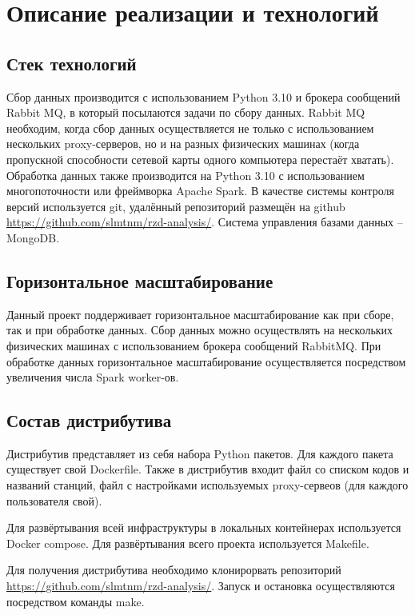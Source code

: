 \documentclass[conference]{IEEEtran}
\begin{document}
\section{Описание реализации и технологий}

\subsection{Стек технологий}
Сбор данных производится с использованием Python 3.10 и брокера сообщений Rabbit MQ, в который посылаются задачи по сбору данных. Rabbit MQ необходим, когда сбор данных осуществляется не только с использованием нескольких proxy-серверов, но и на разных физических машинах (когда пропускной способности сетевой карты одного компьютера перестаёт хватать). Обработка данных также производится на Python 3.10 с использованием многопоточности или фреймворка Apache Spark. В качестве системы контроля версий используется git, удалённый репозиторий размещён на github \href{https://github.com/slmtnm/rzd-analysis/}{https://github.com/slmtnm/rzd-analysis/}. Система управления базами данных -- MongoDB.

\subsection{Горизонтальное масштабирование}

Данный проект поддерживает горизонтальное масштабирование как при сборе, так и при обработке данных. Сбор данных можно осуществлять на нескольких физических машинах с использованием брокера сообщений RabbitMQ. При обработке данных горизонтальное масштабирование осуществляется посредством увеличения числа Spark worker-ов.

\subsection{Состав дистрибутива}

Дистрибутив представляет из себя набора Python пакетов. Для каждого пакета существует свой Dockerfile. Также в дистрибутив входит файл со списком кодов и названий станций, файл с настройками используемых proxy-сервеов (для каждого пользователя свой).

Для развёртывания всей инфраструктуры в локальных контейнерах используется Docker compose. Для развёртывания всего проекта используется Makefile.

Для получения дистрибутива необходимо клонирорвать репозиторий \href{https://github.com/slmtnm/rzd-analysis/}{https://github.com/slmtnm/rzd-analysis/}. Запуск и остановка осуществляются посредством команды make.
\end{document}
